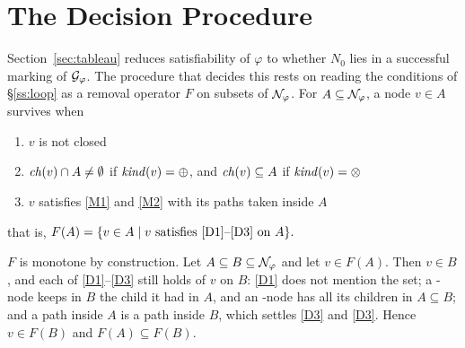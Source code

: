 \section{The Decision Procedure}\label{sec:correct}

Section~\ref{sec:tableau} reduces satisfiability of $\varphi$ to whether $N_0$ lies in a successful
marking of $\mathcal{G}_{\varphi}$. The procedure that decides this rests on reading the conditions of
\S\ref{ss:loop} as a removal operator $F$ on subsets of $\mathcal{N}_{\varphi}$. 
For $A\subseteq\mathcal{N}_{\varphi}$, a node
$v\in A$ survives when
\begin{enumerate}[label={\footnotesize\textbf{(D\arabic*)}}, ref={\footnotesize\textbf{(D\arabic*)}},itemindent=2em,
                   ]
\item\label{D1} $v$ is not closed
\item\label{D2} $\mathit{ch}(v)\cap A\neq\emptyset$ if $\mathit{kind}(v)=\oplus$, and $\mathit{ch}(v)\subseteq A$ if
$\mathit{kind}(v)=\otimes$
\item\label{D3} $v$ satisfies \ref{M1} and \ref{M2} with its paths taken inside $A$
\end{enumerate}
\noindent
that is, $F(A)=\{v\in A \mid \text{$v$ satisfies \ref{D1}--\ref{D3} on $A$} \}.$ 

$F$ is monotone by construction. Let $A\subseteq B\subseteq\mathcal{N}_{\varphi}$ and let $v\in F(A)$. Then
$v\in B$, and each of \ref{D1}--\ref{D3} still holds of $v$ on $B$: \ref{D1} does not mention the
set; a \ORn-node keeps in $B$ the child it had in $A$, and an \ANDn-node has all its children in
$A\subseteq B$; and a path inside $A$ is a path inside $B$, which settles \ref{D3} and \ref{D3}.
Hence $v\in F(B)$ and $F(A)\subseteq F(B)$.






